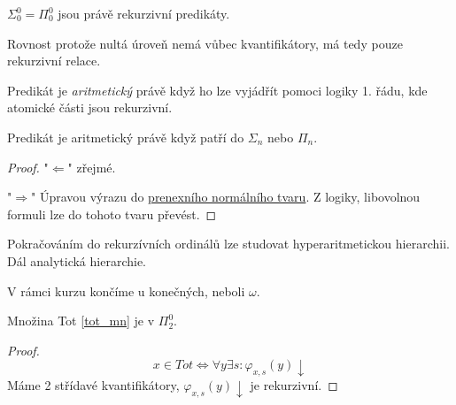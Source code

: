 \begin{observation}
	$\Sigma_0^0 = \Pi_0^0$ jsou právě rekurzivní predikáty.

	Rovnost protože nultá úroveň nemá vůbec kvantifikátory, má tedy pouze rekurzivní relace.
\end{observation}

\begin{definition}
	Predikát je \emph{aritmetický} právě když ho lze vyjádřít pomoci logiky 1. řádu, kde atomické části jsou rekurzivní.
\end{definition}

\begin{observation}
	Predikát je aritmetický právě když patří do $\Sigma_n$ nebo $\Pi_n$.
\end{observation}
\begin{proof}
	"$\Leftarrow$" zřejmé.

	"$\Rightarrow$" Úpravou výrazu do \href{https://en.wikipedia.org/wiki/Prenex_normal_form}{prenexního normálního tvaru}.
	Z logiky, libovolnou formuli lze do tohoto tvaru převést.
\end{proof}

\begin{note}
	Pokračováním do rekurzívních ordinálů lze studovat hyperaritmetickou hierarchii.
	Dál analytická hierarchie.

	V rámci kurzu končíme u konečných, neboli $\omega$.
\end{note}

\begin{example}\label{tot_pi2}
	Množina Tot \cref{tot_mn} je v $\Pi_2^0$.
\end{example}
\begin{proof}
	\[ x \in Tot \iff \forall y \exists s: \varphi_{x, s}(y) \downarrow \]
	Máme 2 střídavé kvantifikátory, $\varphi_{x, s}(y) \downarrow$ je rekurzivní.
\end{proof}

